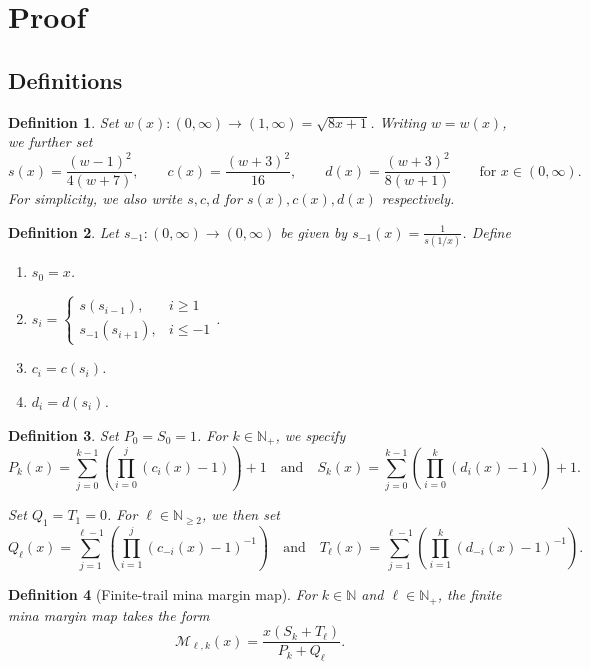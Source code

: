 \documentclass{article}
\newtheorem{definition}{Definition}
\newcommand*{\N}{\mathbb{N}}
\newcommand*{\M}{\mathcal{M}}
\begin{document}
\section{\centering Proof}
\subsection{\centering Definitions}
\begin{definition}
    Set $w(x): (0,\infty)\to(1,\infty)=\sqrt{8x+1}$. Writing $w=w(x)$, we further set
    $$s(x)=\frac{(w-1)^2}{4(w+7)},\qquad c(x)=\frac{(w+3)^2}{16}, \qquad d(x)=\frac{(w+3)^2}{8(w+1)}
    \qquad \text{for } x\in(0,\infty).$$ For simplicity, we also write $s, c, d$ for $s(x), c(x),
    d(x)$ respectively.
\end{definition}

\begin{definition}
    Let $s_{-1}:(0,\infty)\to(0,\infty)$ be given by $s_{-1}(x)=\frac{1}{s(1/x)}$. Define
    \begin{enumerate}[label=(\arabic*)]
        \item $s_0 = x$.
        \item $s_i = \begin{cases}
            s(s_{i-1}), & i \geq 1 \\
            s_{-1}(s_{i+1}), & i \leq -1
        \end{cases}$.
        \item $c_i = c(s_i)$.
        \item $d_i = d(s_i)$.
    \end{enumerate}
\end{definition}

\begin{definition}
    Set $P_0=S_0=1$. For $k\in\N_+$, we specify 
    $$P_{k}(x)=\sum_{j=0}^{k-1}\left(\prod_{i=0}^{j}(c_i(x)-1)\right) + 1 \quad \text{and} \quad
    S_{k}(x) = \sum_{j=0}^{k-1}\left(\prod_{i=0}^{k}(d_i(x)-1)\right) + 1.$$

    Set $Q_1=T_1=0$. For $\ell\in\N_{\geq2}$, we then set 
    $$Q_{\ell}(x)=\sum_{j=1}^{\ell-1}\left(\prod_{i=1}^{j}(c_{-i}(x)-1)^{-1}\right) \quad \text{and} \quad
    T_{\ell}(x) = \sum_{j=1}^{\ell-1}\left(\prod_{i=1}^{k}(d_{-i}(x)-1)^{-1}\right).$$
\end{definition}

\begin{definition}[Finite-trail mina margin map]
    For $k\in\N$ and $\ell\in\N_+$, the finite mina margin map takes the form 
    $$\M_{\ell, k}(x)=\frac{x(S_k+T_\ell)}{P_k+Q_\ell}.$$
\end{definition}
\end{document}
